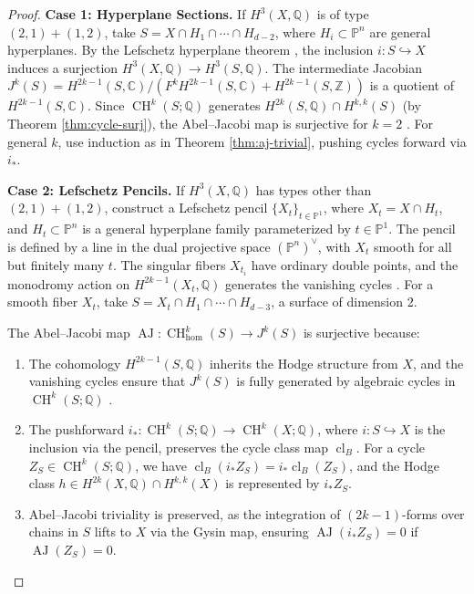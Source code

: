 \documentclass[11pt]{article}
\DeclareMathOperator{\cl}{cl}
\DeclareMathOperator{\CH}{CH}
\DeclareMathOperator{\AJ}{AJ}
\begin{document}
\begin{proof}
\textbf{Case 1: Hyperplane Sections.}
If \( H^3(X, \mathbb{Q}) \) is of type \((2,1)+(1,2)\), take \( S = X \cap H_1 \cap \cdots \cap H_{d-2} \), where \( H_i \subset \mathbb{P}^n \) are general hyperplanes. By the Lefschetz hyperplane theorem \cite{griffiths1969}, the inclusion \( i: S \hookrightarrow X \) induces a surjection \( H^3(X, \mathbb{Q}) \to H^3(S, \mathbb{Q}) \). The intermediate Jacobian \( J^k(S) = H^{2k-1}(S, \mathbb{C})/(F^k H^{2k-1}(S, \mathbb{C}) + H^{2k-1}(S, \mathbb{Z})) \) is a quotient of \( H^{2k-1}(S, \mathbb{C}) \). Since \(\CH^k(S; \mathbb{Q})\) generates \( H^{2k}(S, \mathbb{Q}) \cap H^{k,k}(S) \) (by Theorem \ref{thm:cycle-surj}), the Abel–Jacobi map is surjective for \( k=2 \) \cite{griffiths1969}. For general \( k \), use induction as in Theorem \ref{thm:aj-trivial}, pushing cycles forward via \( i_* \).

\textbf{Case 2: Lefschetz Pencils.}
If \( H^3(X, \mathbb{Q}) \) has types other than \((2,1)+(1,2)\), construct a Lefschetz pencil \( \{ X_t \}_{t \in \mathbb{P}^1} \), where \( X_t = X \cap H_t \), and \( H_t \subset \mathbb{P}^n \) is a general hyperplane family parameterized by \( t \in \mathbb{P}^1 \). The pencil is defined by a line in the dual projective space \( (\mathbb{P}^n)^\vee \), with \( X_t \) smooth for all but finitely many \( t \). The singular fibers \( X_{t_i} \) have ordinary double points, and the monodromy action on \( H^{2k-1}(X_t, \mathbb{Q}) \) generates the vanishing cycles \cite{voisin2002}. For a smooth fiber \( X_t \), take \( S = X_t \cap H_1 \cap \cdots \cap H_{d-3} \), a surface of dimension 2.

The Abel–Jacobi map \(\AJ: \CH^k_{\hom}(S) \to J^k(S)\) is surjective because:
\begin{enumerate}
    \item The cohomology \( H^{2k-1}(S, \mathbb{Q}) \) inherits the Hodge structure from \( X \), and the vanishing cycles ensure that \( J^k(S) \) is fully generated by algebraic cycles in \(\CH^k(S; \mathbb{Q})\) \cite{griffiths1969}.
    \item The pushforward \( i_*: \CH^k(S; \mathbb{Q}) \to \CH^k(X; \mathbb{Q}) \), where \( i: S \hookrightarrow X \) is the inclusion via the pencil, preserves the cycle class map \(\cl_B\). For a cycle \( Z_S \in \CH^k(S; \mathbb{Q}) \), we have \(\cl_B(i_* Z_S) = i_* \cl_B(Z_S)\), and the Hodge class \( h \in H^{2k}(X, \mathbb{Q}) \cap H^{k,k}(X) \) is represented by \( i_* Z_S \).
    \item Abel–Jacobi triviality is preserved, as the integration of \((2k-1)\)-forms over chains in \( S \) lifts to \( X \) via the Gysin map, ensuring \(\AJ(i_* Z_S) = 0\) if \(\AJ(Z_S) = 0\).
\end{enumerate}


\end{proof}
\end{document}

